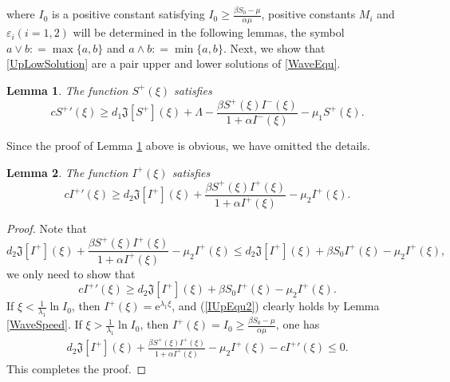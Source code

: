 \documentclass[final,3p,times]{elsarticle}
\newtheorem{lemma}{Lemma}[section]
\numberwithin{equation}{section}
\begin{document}
where $I_0$ is a positive constant satisfying $I_0\geqslant \frac{\beta S_0 - \mu}{\alpha \mu}$, positive constants $M_i$ and $\varepsilon_i(i=1,2)$ will be determined in the following lemmas, the symbol $a\vee b : = \max\{a,b\}$ and $a\wedge b : = \min\{a,b\}$.
Next, we show that \eqref{UpLowSolution} are a pair upper and lower solutions of \eqref{WaveEqu}.

\begin{lemma}\label{SVUp}
The function $S^+(\xi)$ satisfies
\begin{equation}
\label{SVUpEqu}
c{S^+}'(\xi) \geq d_1\mathfrak{J}[S^+](\xi) + \Lambda -  \frac{\beta S^+(\xi)I^-(\xi)}{1+\alpha I^-(\xi)} - \mu_1 S^+(\xi).
\end{equation}
\end{lemma}
Since the proof of Lemma \ref{SVUp} above is obvious, we have omitted the details.
\begin{lemma}\label{IUp}
The function $ I^+(\xi)$ satisfies
\begin{equation}
\label{IUpEqu}
c {I^+}'(\xi) \geqslant d_2\mathfrak{J}[I^+](\xi) + \frac{\beta S^+(\xi) I^+(\xi)}{1+\alpha I^+(\xi)} - \mu_2 I^+(\xi).
\end{equation}
\end{lemma}

\begin{proof}
Note that
\[
d_2\mathfrak{J}[I^+](\xi) + \frac{\beta S^+(\xi) I^+(\xi)}{1+\alpha I^+(\xi)} - \mu_2 I^+(\xi)
\leqslant d_2\mathfrak{J}[I^+](\xi) + \beta S_0 I^+(\xi) - \mu_2 I^+(\xi),
\]
we only need to show that
\begin{equation}
\label{IUpEqu2}
c {I^+}'(\xi) \geqslant d_2\mathfrak{J}[I^+](\xi) + \beta S_0 I^+(\xi) - \mu_2  I^+(\xi).
\end{equation}
If $\xi < \frac{1}{\lambda_1}\ln I_0$, then $I^+(\xi) = \mathrm{e}^{\lambda_1 \xi}$,
and (\ref{IUpEqu2}) clearly holds by Lemma \ref{WaveSpeed}. If $\xi > \frac{1}{\lambda_1}\ln I_0$, then $I^+(\xi) = I_0 \geqslant \frac{\beta S_0 - \mu}{\alpha \mu}$, one has
\begin{align*}
d_2\mathfrak{J}[I^+](\xi) + \frac{\beta S^+(\xi) I^+(\xi)}{1+\alpha I^+(\xi)} - \mu_2 I^+(\xi) - c {I^+}'(\xi) \leqslant 0.
\end{align*}
This completes the proof.
\end{proof}
\end{document}
